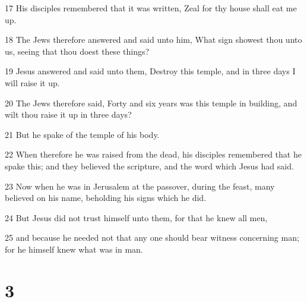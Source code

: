 \par 17 His disciples remembered that it was written, Zeal for thy house shall eat me up.
\par 18 The Jews therefore answered and said unto him, What sign showest thou unto us, seeing that thou doest these things?
\par 19 Jesus answered and said unto them, Destroy this temple, and in three days I will raise it up.
\par 20 The Jews therefore said, Forty and six years was this temple in building, and wilt thou raise it up in three days?
\par 21 But he spake of the temple of his body.
\par 22 When therefore he was raised from the dead, his disciples remembered that he spake this; and they believed the scripture, and the word which Jesus had said.
\par 23 Now when he was in Jerusalem at the passover, during the feast, many believed on his name, beholding his signs which he did.
\par 24 But Jesus did not trust himself unto them, for that he knew all men,
\par 25 and because he needed not that any one should bear witness concerning man; for he himself knew what was in man.

\chapter{3}


